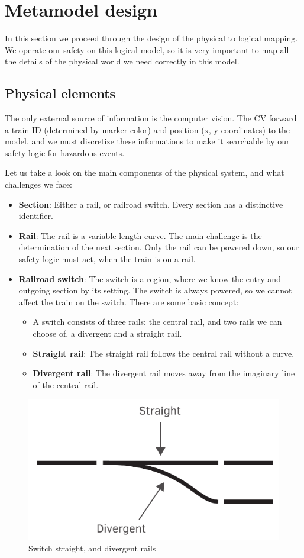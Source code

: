 \section{Metamodel design}
In this section we proceed through the design of the physical to logical mapping. We operate our safety on this logical model, so it is very important to map all the details of the physical world we need correctly in this model.

\subsection{Physical elements}
The only external source of information is the computer vision. The CV forward a train ID (determined by marker color) and position (x, y coordinates) to the model, and we must discretize these informations to make it searchable by our safety logic for hazardous events.

Let us take a look on the main components of the physical system, and what challenges we face:
\begin{itemize}
	\item \textbf{Section}: Either a rail, or railroad switch. Every section has a distinctive identifier.
	\item \textbf{Rail}: The rail is a variable length curve. The main challenge is the determination of the next section. Only the rail can be powered down, so our safety logic must act, when the train is on a rail.
	\item \textbf{Railroad switch}: The switch is a region, where we know the entry and outgoing section by its setting. The switch is always powered, so we cannot affect the train on the switch. There are some basic concept:
	\begin{itemize}
		\item A switch consists of three rails: the central rail, and two rails we can choose of, a divergent and a straight rail.
		\item \textbf{Straight rail}: The straight rail follows the central rail without a curve.
		\item \textbf{Divergent rail}: The divergent rail moves away from the imaginary line of the central rail.
	\end{itemize}
\end{itemize}

\begin{figure}[h]
	\centering
	\includegraphics[width=0.5\linewidth]{include/figures/chapter_6/metamodel_switch_basics}
	\caption{Switch straight, and divergent rails}
	\label{fig:case_study:metamodel_switch_basics}
\end{figure}

